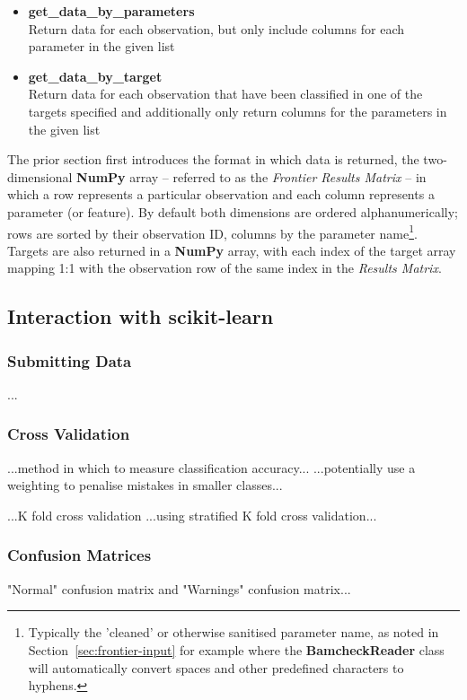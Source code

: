 \begin{itemize}
    \item \textbf{get\_data\_by\_parameters} \hfill\\
        Return data for each observation, but only include columns
        for each parameter in the given list
    \item \textbf{get\_data\_by\_target} \hfill\\
        Return data for each observation that have been classified in one of the
        targets specified and additionally only return columns for the
        parameters in the given list
\end{itemize}

The prior section first introduces the format in which data is returned, the
two-dimensional \textbf{NumPy} array -- referred to as the \textit{Frontier Results
Matrix} -- in which a row represents a particular observation and each column
represents a parameter (or feature). By default both dimensions are
ordered alphanumerically; rows are sorted by their observation ID, columns by
the parameter name\footnote{Typically the 'cleaned' or otherwise sanitised
    parameter name, as noted in Section~\ref{sec:frontier-input} for example
where the \textbf{BamcheckReader} class will automatically convert spaces and
other predefined characters to hyphens.}. Targets are also returned in a
\textbf{NumPy} array, with each index of the target array mapping 1:1 with the
observation row of the same index in the \textit{Results Matrix}.


\subsection{Interaction with scikit-learn}
\subsubsection{Submitting Data}
...
\subsubsection{Cross Validation}

...method in which to measure classification accuracy...
...potentially use a weighting to penalise mistakes in smaller classes...

...K fold cross validation
...using stratified K fold cross validation...

\subsubsection{Confusion Matrices}
"Normal" confusion matrix and "Warnings" confusion matrix...


